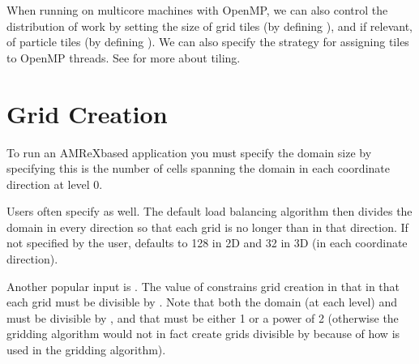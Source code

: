 \documentclass[letterpaper,10pt,english]{sphinxmanual}
\begin{document}
\sphinxAtStartPar
When running on multicore machines with OpenMP, we can also control the distribution of
work by setting the size of grid tiles (by defining ), and if relevant, of
particle tiles (by defining ).  We can also specify the strategy for assigning
tiles to OpenMP threads.  See {\hyperref[\detokenize{Basics:sec-basics-mfiter-tiling}]{}} for more about tiling.


\section{Grid Creation}
\label{\detokenize{GridCreation:grid-creation}}\label{\detokenize{GridCreation:sec-grid-creation}}\label{\detokenize{GridCreation::doc}}
\sphinxAtStartPar
To run an AMReX\sphinxhyphen{}based application you must specify the domain size by
specifying  \textendash{} this is the number of cells spanning the domain
in each coordinate direction at level 0.

\sphinxAtStartPar
Users often specify  as well. The default load balancing algorithm then divides the
domain in every direction so that each grid is no longer than  in that direction.
If not specified by the user,  defaults to 128 in 2D and 32 in 3D (in each coordinate direction).

\sphinxAtStartPar
Another popular input is .  The value of 
constrains grid creation in that in that each grid must be divisible by .
Note that both the domain (at each level) and  must be divisible by ,
and that  must be either 1 or a power of 2 (otherwise the gridding algorithm
would not in fact create grids divisible by   because of how  
is used in the gridding algorithm).
\end{document}
